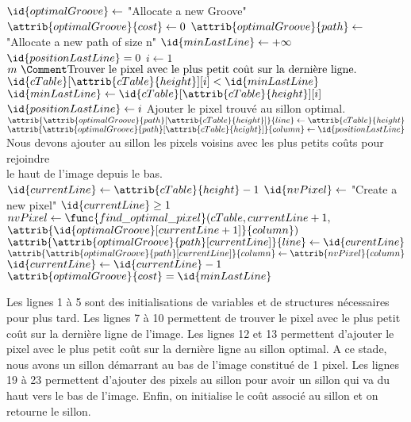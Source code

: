 \documentclass[a4paper, 11pt, oneside]{article}
\begin{document}
\begin{codebox} %
        \li $\id{optimalGroove} \gets$ "Allocate a new Groove"
        \li $\attrib{optimalGroove}{cost} \gets 0$
        \li $\attrib{optimalGroove}{path} \gets$ "Allocate a new path of size n"
        \li $\id{minLastLine} \gets +\infty$
        \li $\id{positionLastLine} = 0$
        \li
        \li \For $i \gets 1$ \To $m \text{ }\Comment \text{Trouver le pixel avec le plus petit coût sur la dernière ligne.}$
                \Do
        \li     	\If $\id{cTable}[\attrib{cTable}{height}][i] < \id{minLastLine}$
        \li 			\Then
        					$\id{minLastLine} \gets \id{cTable}[\attrib{cTable}{height}][i]$
        	\li				$\id{positionLastLine} \gets i$
        				\End
                \End
        \li \Comment Ajouter le pixel trouvé au sillon optimal.
        \li $\attrib{\attrib{optimalGroove}{path}[\attrib{cTable}{height}]}{line} \gets \attrib{cTable}{height}$
        \li $\attrib{\attrib{optimalGroove}{path}[\attrib{cTable}{height}]}{column} \gets \id{positionLastLine}$
        \li
        \li \Comment Nous devons ajouter au sillon les pixels voisins avec les plus petits coûts pour rejoindre\\ \hspace {0.3cm} le haut de l'image depuis le bas.
        \li $\id{currentLine} \gets \attrib{cTable}{height} - 1$
        \li $\id{nvPixel} \gets$ "Create a new pixel"
        \li
        \li \While $\id{currentLine} \geq 1$
        \li	\Do
        		$nvPixel \gets \func{find\_optimal\_pixel}(cTable, currentLine + 1,$ \\ \hspace{6.15cm} $\attrib{\id{optimalGroove}[currentLine + 1]}{column})$
        \li		$\attrib{\attrib{optimalGroove}{path}[currentLine]}{line} \gets \id{curentLine}$
        \li		$\attrib{\attrib{optimalGroove}{path}[currentLine]}{column} \gets \attrib{nvPixel}{column}$
        \li		$\id{currentLine} \gets \id{currentLine} - 1$
        \li	\End
        \li	$\attrib{optimalGroove}{cost} = \id{minLastLine}$
        \li \Return {}
\end{codebox}

Les lignes 1 à 5 sont des initialisations de variables et de structures nécessaires pour plus tard. Les lignes 7 à 10 permettent de trouver le pixel avec le plus petit coût sur la dernière ligne de l'image. Les lignes 12 et 13 permettent d'ajouter le pixel avec le plus petit coût sur la dernière ligne au sillon optimal. A ce stade, nous avons un sillon démarrant au bas de l'image constitué de 1 pixel. Les lignes 19 à 23 permettent d'ajouter des pixels au sillon pour avoir un sillon qui va du haut vers le bas de l'image. Enfin, on initialise le coût associé au sillon et on retourne le sillon.
\end{document}
